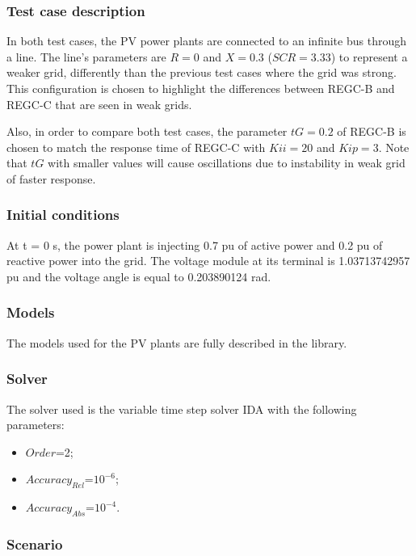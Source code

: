 \documentclass[a4paper, 12pt]{report}
\begin{document}
\subsubsection{Test case description}
In both test cases, the PV power plants are connected to an infinite bus through a line.
The line's parameters are $R = 0$ and $X = 0.3$ ($SCR = 3.33 $) to represent a weaker grid, differently than the previous test cases where the grid was strong.
This configuration is chosen to highlight the differences between REGC-B and REGC-C that are seen in weak grids.

Also, in order to compare both test cases, the parameter $tG = 0.2$ of REGC-B is chosen to match the response time of REGC-C with $Kii = 20$ and $Kip = 3$. Note that $tG$ with smaller values will cause oscillations due to instability in weak grid of faster response.


\subsubsection{Initial conditions}

\par At t = 0 s, the power plant is injecting 0.7 pu of active power and 0.2 pu of reactive power into the grid. The voltage module at its terminal is 1.03713742957 pu and the voltage angle is equal to 0.203890124 rad.

\subsubsection{Models}

\par The models used for the PV plants are fully described in the \Dynawo library.

\subsubsection{Solver}

\par The solver used is the variable time step solver IDA with the following parameters:
\begin{itemize}
\item $Order$=2;
\item $Accuracy_{Rel}$=$10^{-6}$;
\item $Accuracy_{Abs}$=$10^{-4}$.
\end{itemize}

\subsubsection{Scenario}
\end{document}
